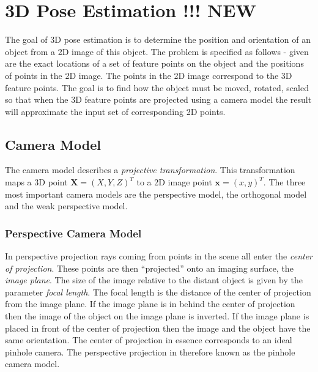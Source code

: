\documentclass[11pt,a4paper]{report}
\begin{document}

\section{3D Pose Estimation !!! NEW}
The goal of 3D pose estimation is to determine the position and orientation of
an object from a 2D image of this object. The problem is specified as follows -
given are the exact locations of a set of feature points on the object and the
positions of points in the 2D
image. The points in the 2D image correspond to the 3D feature points. The goal
is to find how the object must be moved, rotated, scaled so that when the
3D feature points are projected using a camera model the result will approximate
the input set of corresponding 2D points.  

\subsection{Camera Model}
The camera model describes a \textit{projective transformation}. This transformation maps a 3D
point $\mathbf{X} = (X,Y,Z)^T$ to a 2D image point $\mathbf{x} = (x,y)^T$. The
three most important camera models are the perspective model, the orthogonal
model and the weak perspective model.


\subsubsection{Perspective Camera Model}
In perspective projection rays coming from points in the scene all enter the \textit{center of
projection}. These points are then ``projected'' onto an imaging surface, the
\textit{image plane}. The size of the image relative to the distant object is given by
the parameter \textit{focal length}. The focal length is the distance of the
center of projection from the image plane. If the image plane is in behind the
center of projection then the image of the object on the image plane is
inverted. If the image plane is placed in front of the center of projection then the image and
the object have the same orientation. The center of projection in essence
corresponds to an ideal pinhole camera. The perspective projection in therefore known as the
pinhole camera model. 
\end{document}
